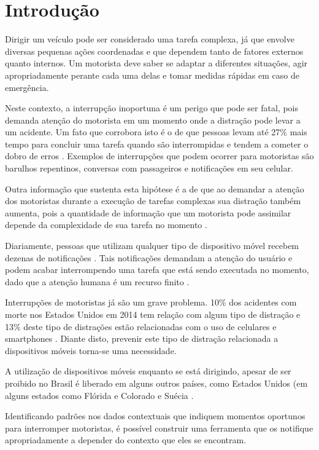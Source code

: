 \chapter{Introdução}
\label{introducao}

Dirigir um veículo pode ser considerado uma tarefa complexa, já que envolve diversas pequenas ações coordenadas e
que dependem tanto de fatores externos quanto internos. Um motorista deve saber se adaptar a diferentes situações,
agir apropriadamente perante cada uma delas e tomar medidas rápidas em caso de emergência.

Neste contexto, a interrupção inoportuna é um perigo que pode ser fatal, pois demanda atenção do motorista em um momento
onde a distração pode levar a um acidente. Um fato que corrobora isto é o de que pessoas levam até 27\% mais tempo para
concluir uma tarefa quando são interrompidas e tendem a cometer o dobro de erros \cite{bailey2006need}. Exemplos de
interrupções que podem ocorrer para motoristas são barulhos repentinos, conversas com passageiros e notificações em
seu celular.

Outra informação que sustenta esta hipótese é a de que ao demandar a atenção dos motoristas durante a execução de
tarefas complexas sua distração também aumenta, pois a quantidade de informação que um motorista pode assimilar
depende da complexidade de sua tarefa no momento \cite{schneegass2013data}.

Diariamente, pessoas que utilizam qualquer tipo de dispositivo móvel recebem dezenas de notificações \cite{pielot2014situ}. Tais notificações
demandam a atenção do usuário e podem acabar interrompendo uma tarefa que está sendo executada no momento, dado que a
atenção humana é um recurso finito \cite{simon1971designing}.

Interrupções de motoristas já são um grave problema. 10\% dos acidentes com morte nos Estados Unidos em 2014 tem relação
com algum tipo de distração e 13\% deste tipo de distrações estão relacionadas com o uso de celulares e smartphones
\cite{distracted2014}. Diante disto, prevenir este tipo de distração relacionada a dispositivos móveis torna-se uma necessidade.

A utilização de dispositivos móveis enquanto se está dirigindo, apesar de ser proibido no Brasil é liberado em alguns
outros países, como Estados Unidos (em alguns estados como Flórida e Colorado \cite{cellphoneuse} \cite{distracteddriving} e Suécia \cite{swedendrive}.

Identificando padrões nos dados contextuais que indiquem momentos oportunos para interromper motoristas, é possível
construir uma ferramenta que os notifique apropriadamente a depender do contexto que eles se encontram.

